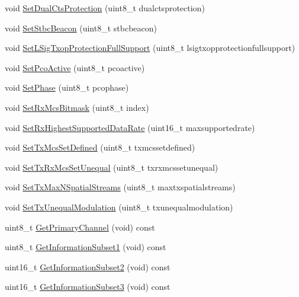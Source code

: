 \begin{DoxyCompactItemize}
\item 
void \hyperlink{classns3_1_1HtOperation_a8e7f04136140a815cc256a031dbde196}{Set\+Dual\+Cts\+Protection} (uint8\+\_\+t dualctsprotection)
\item 
void \hyperlink{classns3_1_1HtOperation_a67bbed3842dd51908a7bdc421cba899a}{Set\+Stbc\+Beacon} (uint8\+\_\+t stbcbeacon)
\item 
void \hyperlink{classns3_1_1HtOperation_aa5d749af7d6fb9f58b0aa5b2a768819d}{Set\+L\+Sig\+Txop\+Protection\+Full\+Support} (uint8\+\_\+t lsigtxopprotectionfullsupport)
\item 
void \hyperlink{classns3_1_1HtOperation_a8a678022d44bddd3758c2116abc07663}{Set\+Pco\+Active} (uint8\+\_\+t pcoactive)
\item 
void \hyperlink{classns3_1_1HtOperation_a385633179d80599f15648995e091981d}{Set\+Phase} (uint8\+\_\+t pcophase)
\item 
void \hyperlink{classns3_1_1HtOperation_ad34b6ce9c3d2dd1e2eaeff08bd127fc2}{Set\+Rx\+Mcs\+Bitmask} (uint8\+\_\+t index)
\item 
void \hyperlink{classns3_1_1HtOperation_a155ec22068fb0cd2c14a1ebd07736064}{Set\+Rx\+Highest\+Supported\+Data\+Rate} (uint16\+\_\+t maxsupportedrate)
\item 
void \hyperlink{classns3_1_1HtOperation_a4ec33930f1a72a41a91f886c15309ad5}{Set\+Tx\+Mcs\+Set\+Defined} (uint8\+\_\+t txmcssetdefined)
\item 
void \hyperlink{classns3_1_1HtOperation_a82a0f7e6804af266b28d64456d6aed87}{Set\+Tx\+Rx\+Mcs\+Set\+Unequal} (uint8\+\_\+t txrxmcssetunequal)
\item 
void \hyperlink{classns3_1_1HtOperation_a19963e6e5785667ea77e5e2994f3bbfd}{Set\+Tx\+Max\+N\+Spatial\+Streams} (uint8\+\_\+t maxtxspatialstreams)
\item 
void \hyperlink{classns3_1_1HtOperation_a721fa6302f2cd95e21e67760c3cf48f2}{Set\+Tx\+Unequal\+Modulation} (uint8\+\_\+t txunequalmodulation)
\item 
uint8\+\_\+t \hyperlink{classns3_1_1HtOperation_a548e7a5d4359d2ac3e1962d11176f5de}{Get\+Primary\+Channel} (void) const 
\item 
uint8\+\_\+t \hyperlink{classns3_1_1HtOperation_a3ac12f5c33ce1ad6716029e1615166a0}{Get\+Information\+Subset1} (void) const 
\item 
uint16\+\_\+t \hyperlink{classns3_1_1HtOperation_a1406f6bdbdba5e5556606e593b4b3260}{Get\+Information\+Subset2} (void) const 
\item 
uint16\+\_\+t \hyperlink{classns3_1_1HtOperation_a7d6d82eee8c282d51bdc7701a57c318a}{Get\+Information\+Subset3} (void) const 

\end{DoxyCompactItemize}
